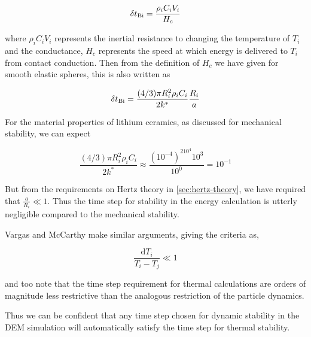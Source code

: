 \begin{equation}
	\delta t_{\mathrm{Bi}} = \frac{\rho_i C_i V_i}{H_c}
\end{equation}

where $\rho_i C_i V_i$ represents the inertial resistance to changing the temperature of $T_i$ and the conductance, $H_c$ represents the speed at which energy is delivered to $T_i$ from contact conduction. Then from the definition of $H_c$ we have given for smooth elastic spheres, this is also written as

\begin{equation}
	\delta t_{\mathrm{Bi}} = \frac{(4/3)\pi R_i^2\rho_i C_i}{2k^*}\frac{R_i}{a}
\end{equation}

For the material properties of lithium ceramics, as discussed for mechanical stability, we can expect

\begin{equation*}
	\frac{(4/3)\pi R_i^2\rho_i C_i}{2k^*} \approx \frac{(10^{-4})^210^{4}10^3}{10^0} = 10^{-1}
\end{equation*}

But from the requirements on Hertz theory in \cref{sec:hertz-theory}, we have required that $\frac{a}{R_i} \ll 1$. Thus the time step for stability in the energy calculation is utterly negligible compared to the mechanical stability.

Vargas and McCarthy\cite{Vargas2001} make similar arguments, giving the criteria as,

\begin{equation}
	\frac{\mathrm{d}T_i}{T_i - T_j} \ll 1
\end{equation}

and too note that the time step requirement for thermal calculations are orders of magnitude less restrictive than the analogous restriction of the particle dynamics.

Thus we can be confident that any time step chosen for dynamic stability in the DEM simulation will automatically satisfy the time step for thermal stability. 






